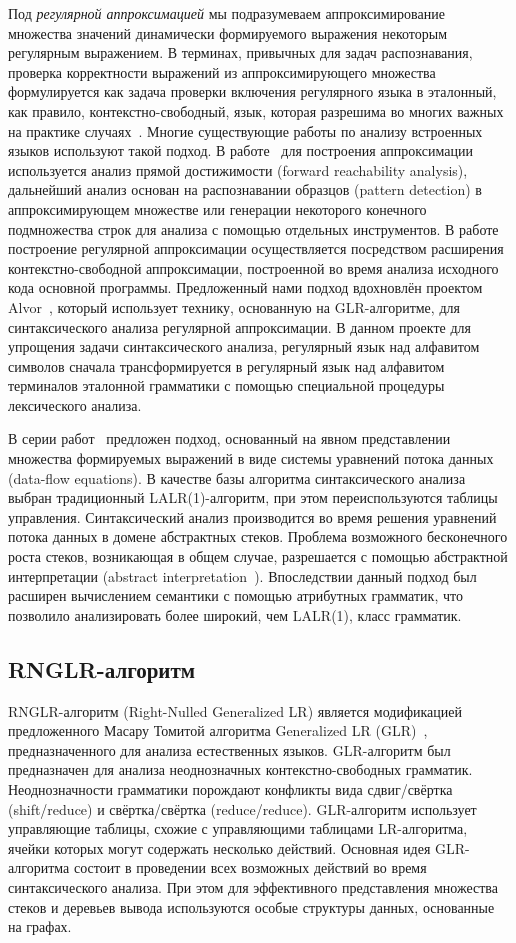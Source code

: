 Под \emph{регулярной аппроксимацией} мы подразумеваем аппроксимирование множества значений динамически формируемого выражения некоторым регулярным выражением. В терминах, привычных для задач распознавания, проверка корректности выражений из аппроксимирующего множества формулируется как задача проверки включения регулярного языка в эталонный, как правило, контекстно-свободный, язык, которая разрешима во многих важных на практике случаях~\cite{LangInclusion}. Многие существующие работы по анализу встроенных языков используют такой подход. В работе~\cite{Stranger} для построения аппроксимации используется анализ прямой достижимости (forward reachability analysis), дальнейший анализ основан на распознавании образцов (pattern detection) в аппроксимирующем множестве или генерации некоторого конечного подмножества строк для анализа с помощью отдельных инструментов. В работе~\cite{JSA} построение регулярной аппроксимации осуществляется посредством расширения контекстно-свободной аппроксимации, построенной во время анализа исходного кода основной программы. Предложенный нами подход вдохновлён проектом Alvor~\cite{Alvor,Alvor2}, который использует технику, основанную на GLR-алгоритме, для синтаксического анализа регулярной аппроксимации. В данном проекте для упрощения задачи синтаксического анализа, регулярный язык над алфавитом символов сначала трансформируется в регулярный язык над алфавитом терминалов эталонной грамматики с помощью специальной процедуры лексического анализа. 

В серии работ~\cite{AbstrParsing,LRAbstrParsing,LRAbstrParsingSema} предложен подход, основанный на явном представлении множества формируемых выражений в виде системы уравнений потока данных (data-flow equations). В качестве базы алгоритма синтаксического анализа выбран традиционный LALR(1)-алгоритм, при этом переиспользуются таблицы управления. Синтаксический анализ производится во время решения уравнений потока данных в домене абстрактных стеков. Проблема возможного бесконечного роста стеков, возникающая в общем случае, разрешается с помощью абстрактной интерпретации (abstract interpretation~\cite{AbstractInterpretation}). Впоследствии данный подход был расширен вычислением семантики с помощью атрибутных грамматик, что позволило анализировать более широкий, чем LALR(1), класс грамматик. 

\subsection{RNGLR-алгоритм}
RNGLR-алгоритм (Right-Nulled Generalized LR) является модификацией предложенного Масару Томитой алгоритма Generalized LR (GLR)~\cite{Tomita}, предназначенного для анализа естественных языков. GLR-алгоритм был предназначен для анализа неоднозначных контекстно-свободных грамматик. Неоднозначности грамматики порождают конфликты вида сдвиг/свёртка (shift/reduce) и свёртка/свёртка (reduce/reduce). GLR-алгоритм использует управляющие таблицы, схожие с управляющими таблицами LR-алгоритма, ячейки которых могут содержать несколько действий. Основная идея GLR-алгоритма состоит в проведении всех возможных действий во время синтаксического анализа. При этом для эффективного представления множества стеков и деревьев вывода используются особые структуры данных, основанные на графах.

